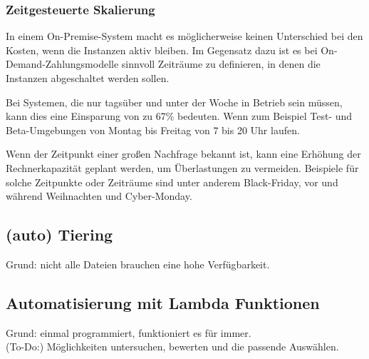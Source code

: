

\subsubsection{Zeitgesteuerte Skalierung}
In einem On-Premise-System macht es möglicherweise keinen Unterschied bei den Kosten, wenn die Instanzen aktiv bleiben. 
Im Gegensatz dazu ist es bei On-Demand-Zahlungsmodelle sinnvoll Zeiträume zu definieren, in denen die Instanzen abgeschaltet werden sollen.

Bei Systemen, die nur tagsüber und unter der Woche in Betrieb sein müssen, kann dies eine Einsparung von zu 67\% bedeuten.  Wenn zum Beispiel Test- und Beta-Umgebungen von Montag bis Freitag von 7 bis 20 Uhr laufen.




Wenn der Zeitpunkt einer großen Nachfrage bekannt ist, kann eine Erhöhung der Rechnerkapazität geplant werden, um Überlastungen zu vermeiden.
Beispiele für solche Zeitpunkte oder Zeiträume sind unter anderem Black-Friday, vor und während Weihnachten und Cyber-Monday.

\subsection{(auto) Tiering }
Grund: nicht alle Dateien brauchen eine hohe Verfügbarkeit.

\subsection{Automatisierung mit Lambda Funktionen}
Grund: einmal programmiert, funktioniert es für immer.
\\(To-Do:) Möglichkeiten untersuchen, bewerten und die passende Auswählen.


